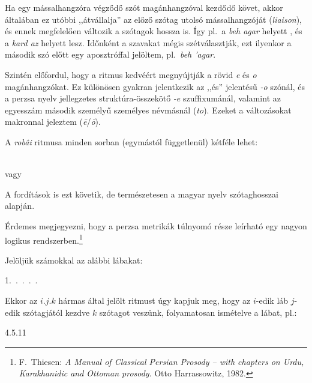 Ha egy mássalhangzóra végződő szót magánhangzóval kezdődő követ, akkor
általában ez utóbbi ,,átvállalja'' az előző szótag utolsó
mássalhangzóját (\emph{liaison}), és ennek megfelelően változik a
szótagok hossza is. Így pl.~a \emph{beh agar} \metra{\m\b\m} helyett
\metra{\b\b\m}, és a \emph{kard az} \metra{\m\b\m} helyett
\metra{\m\m} lesz. Időnként a szavakat mégis szétválasztják, ezt
ilyenkor a második szó előtt egy aposztróffal jelöltem, pl.~\emph{beh
'agar}.

Szintén előfordul, hogy a ritmus kedvéért megnyújtják a rövid \emph{e}
és \emph{o} magánhangzókat. Ez különösen gyakran jelentkezik az ,,és''
jelentésű \emph{-o} szónál, és a perzsa nyelv jellegzetes
struktúra-összekötő \emph{-e} szuffixumánál, valamint az egyesszám
második személyű személyes névmásnál (\emph{to}). E\-ze\-ket a
változásokat makronnal jeleztem (\emph{ē}/\emph{ō}).

A \emph{robâi} ritmusa minden sorban (egymástól függetlenül) kétféle
lehet:
\begin{center}
  {\large\metra{\m\m\mbb\s\m\m\mbb\s\m\m\mbb\s\m\cc}}\\
  vagy\\
  {\large\metra{\m\m\mbb\s\m\b\m\b\s\m\m\mbb\s\m\cc}}
\end{center}

A fordítások is ezt követik, de természetesen a magyar nyelv
szótaghosszai alapján.

\begin{center}
\end{center}

Érdemes megjegyezni, hogy a perzsa metrikák túlnyomó része leírható
egy nagyon logikus rendszerben.\footnote{F.~Thiesen: \emph{A Manual of
    Classical Persian Prosody -- with chapters on Urdu, Karakhanidic
    and Ottoman prosody}. Otto Harrassowitz, 1982.}

Jelöljük számokkal az alábbi lábakat:
\begin{center}
  1.~\metra{\b\m\m}.~\metra{\b\m\m\m}.~\metra{\b\b\m\m}.~\metra{\b\m\b\m\b\b\m\m}.~\metra{\m\m\b\b\m\b\m\b}
\end{center}

Ekkor az $i.j.k$ hármas által jelölt ritmust úgy kapjuk meg, hogy az
$i$-edik láb $j$-edik szótagjától kezdve $k$ szótagot veszünk,
folyamatosan ismételve a lábat, pl.:
\begin{center}
4{.}5{.}11 \metra{\b\b\m\m\s\b\m\b\m\s\b\b\m}
\end{center}

